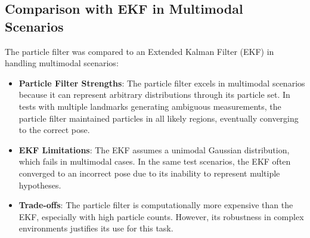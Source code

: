 \documentclass[11pt]{article}
\begin{document}
\subsection{Comparison with EKF in Multimodal Scenarios}
The particle filter was compared to an Extended Kalman Filter (EKF) in handling multimodal scenarios:
\begin{itemize}
    \item \textbf{Particle Filter Strengths}: The particle filter excels in multimodal scenarios because it can represent arbitrary distributions through its particle set. In tests with multiple landmarks generating ambiguous measurements, the particle filter maintained particles in all likely regions, eventually converging to the correct pose.
    \item \textbf{EKF Limitations}: The EKF assumes a unimodal Gaussian distribution, which fails in multimodal cases. In the same test scenarios, the EKF often converged to an incorrect pose due to its inability to represent multiple hypotheses.
    \item \textbf{Trade-offs}: The particle filter is computationally more expensive than the EKF, especially with high particle counts. However, its robustness in complex environments justifies its use for this task.
\end{itemize}
\end{document}
